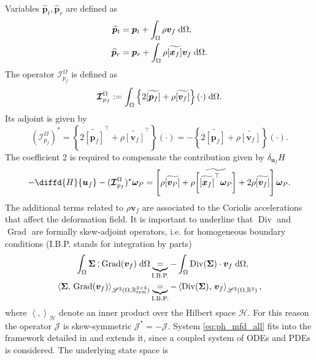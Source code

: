 \documentclass{svjour3}                     %
\DeclareMathOperator*{\Grad}{Grad}
\DeclareMathOperator*{\Div}{Div}
\newcommand{\crmat}[1]{\ensuremath{\widetilde{\left[#1\right]}}}
\def\onedot{$\mathsurround0pt\ldotp$}
\def\cddot{%
	\mathbin{\vcenter{\baselineskip.67ex
			\hbox{\onedot}\hbox{\onedot}}%
}}
\begin{document}
Variables $\widehat{\bm{p}}_t, \widehat{\bm{p}}_r$ are defined as
\begin{equation}
\label{eq:mod_momenta}
\begin{aligned}
\widehat{\bm{p}}_t &= \bm{p}_t + \int_{\Omega} \rho \bm{v}_f \d{\Omega}, \\
\widehat{\bm{p}}_r &= \bm{p}_r + \int_{\Omega} \rho \crmat{\bm{x}_f}\bm{v}_f \d{\Omega}. \\
\end{aligned}
\end{equation}
The operator $\bm{\mathcal{I}}_{p_f}^\Omega$ is defined as 
\begin{equation}
\label{eq:mod_momentafl}
\bm{\mathcal{I}}_{p_f}^\Omega := \int_\Omega \left\{2 \crmat{\bm{p}_f} + \rho \crmat{\bm{v}_f} \right\}(\cdot) \d{\Omega}.
\end{equation}
Its  adjoint is given by
\begin{equation*}
(\bm{\mathcal{I}}_{p_f}^\Omega)^* = \left\{2 \crmat{\bm{p}_f}^\top + \rho \crmat{\bm{v}_f}^\top \right\}(\cdot) = - \left\{2 \crmat{\bm{p}_f} + \rho \crmat{\bm{v}_f} \right\}(\cdot).
\end{equation*} 
The coefficient 2 is required to compensate the contribution given by $\delta_{\bm{u}_f} H$ 
\[
-\diffd{H}{\bm{u}_f} - (\bm{\mathcal{I}}_{p_f}^\Omega)^* \bm{\omega}_P = \left[\rho \crmat{\bm{v}_P} + \rho \crmat{\crmat{\bm{x}_f}^\top \bm\omega_P} + 2 \rho \crmat{\bm{v}_f} \right] \bm\omega_P.
\]
The additional terms related to $\rho \bm{v}_f$ are associated to the Coriolis accelerations that affect the deformation field. It is important to underline that $\Div$ and $\Grad$ are formally skew-adjoint operators, i.e. for homogeneous boundary conditions (I.B.P. stands for integration by parts)
\begin{align*}
\int_{\Omega} \bm\Sigma \cddot \Grad(\bm{v}_f) \d{\Omega} &\underbrace{=}_{\text{I.B.P.}} -\int_{\Omega} \Div(\bm\Sigma) \cdot \bm{v}_f \d{\Omega}, \\
\left\langle \bm\Sigma, \, \Grad(\bm{v}_f) \right\rangle_{\mathscr{L}^2(\Omega, \mathbb{R}^{3\times 3}_{\text{sym}})} &\underbrace{=}_{\text{I.B.P.}} -\left\langle\Div(\bm\Sigma), \, \bm{v}_f \right\rangle_{\mathscr{L}^2(\Omega, \mathbb{R}^3)}, 
\end{align*}
where $\left\langle ,  \right\rangle_\mathscr{H}$ denote an inner product over the Hilbert space $\mathscr{H}$. For this reason the operator $\bm{\mathcal{J}}$ is skew-symmetric $\bm{\mathcal{J}}_{}^*=-\bm{\mathcal{J}}$. System \eqref{eq:ph_mfd_all} fits into the framework detailed in \cite{mehrmann2019structurepreserving} and extends it, since a coupled system of ODEs and PDEs is considered. The underlying state space is 
\end{document}
